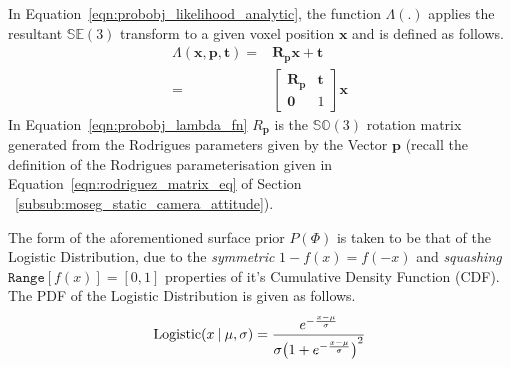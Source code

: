 In Equation~\ref{eqn:probobj_likelihood_analytic}, the function \(\Lambda(.)\)
applies the resultant \(\mathbb{SE}(3)\) transform to a given voxel position
\(\bm{x}\) and is defined as follows.
\begin{align}
  \label{eqn:probobj_lambda_fn}
  \Lambda(\bm{x}, \bm{p}, \bm{t}) ={}&
  \bm{R}_{\bm{p}} \bm{x} + \bm{t}\\
  ={}& 
  \begin{bmatrix}
    \bm{R}_{\bm{p}} & \bm{t} \\
    \bm{0} & 1
  \end{bmatrix}
  \bm{x}
\end{align}
In Equation~\ref{eqn:probobj_lambda_fn} \(R_{\bm{p}}\) is the \(\mathbb{SO}(3)\)
rotation matrix generated from the Rodrigues parameters given by the Vector
\(\bm{p}\) (recall the definition of the Rodrigues parameterisation given in
Equation~\ref{eqn:rodriguez_matrix_eq} of Section
~\ref{subsub:moseg_static_camera_attitude}).

The form of the aforementioned surface prior \(P(\Phi)\) is taken to be that of
the Logistic Distribution, due to the \textit{symmetric} \(1 - f(x) = f(-x)\)
and \textit{squashing} \(\texttt{Range}[f(x)] = [0, 1]\) properties of it's Cumulative
Density Function (CDF). The PDF of the Logistic Distribution is given as follows.
\begin{equation}
  \label{eqn:probobj_logistic_dist}
  \text{Logistic}(x \:\vert\: \mu, \sigma) = \frac
  {e^{-\frac{x - \mu}{\sigma}}}
  {\sigma {\big( 1 + e^{-\frac{x - \mu}{\sigma}} \big)}^{2}}
\end{equation}


